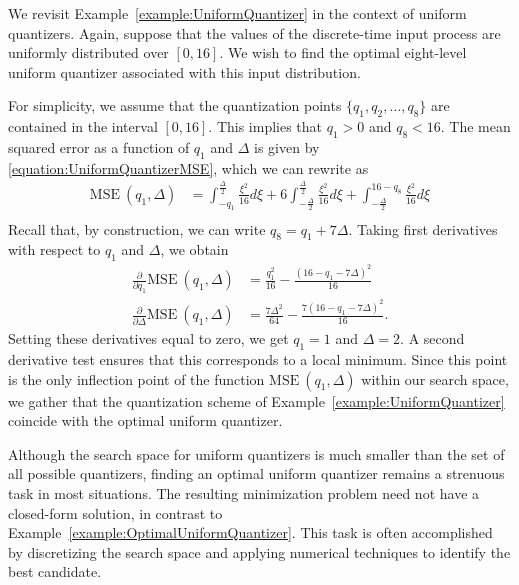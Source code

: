 \begin{example} \label{example:OptimalUniformQuantizer}
We revisit Example~\ref{example:UniformQuantizer} in the context of uniform quantizers.
Again, suppose that the values of the discrete-time input process are uniformly distributed over $[0, 16]$.
We wish to find the optimal eight-level uniform quantizer associated with this input distribution.

For simplicity, we assume that the quantization points $\{ q_1, q_2, \ldots, q_8 \}$ are contained in the interval $[0, 16]$.
This implies that $q_1 > 0$ and $q_8 < 16$.
The mean squared error as a function of $q_1$ and $\Delta$ is given by \eqref{equation:UniformQuantizerMSE}, which we can rewrite as
\begin{equation*}
\begin{split}
\text{MSE}~(q_1, \Delta)
&= \int_{-q_1}^{\frac{\Delta}{2}} \frac{\xi^2}{16} d\xi
+ 6 \int_{- \frac{\Delta}{2}}^{\frac{\Delta}{2}} \frac{\xi^2}{16} d\xi
+ \int_{- \frac{\Delta}{2}}^{16 - q_8} \frac{\xi^2}{16} d\xi \\
\end{split}
\end{equation*}
Recall that, by construction, we can write $q_8 = q_1 + 7 \Delta$.
Taking first derivatives with respect to $q_1$ and $\Delta$, we obtain
\begin{align*}
\frac{\partial}{\partial q_1} \text{MSE}~(q_1, \Delta)
&= \frac{q_1^2}{16} - \frac{(16 - q_1 - 7 \Delta)^2}{16} \\
\frac{\partial}{\partial \Delta} \text{MSE}~(q_1, \Delta)
&= \frac{7 \Delta^2}{64} - \frac{7 (16 - q_1 - 7\Delta)^2}{16} .
\end{align*}
Setting these derivatives equal to zero, we get $q_1 = 1$ and $\Delta = 2$.
A second derivative test ensures that this corresponds to a local minimum.
Since this point is the only inflection point of the function $\text{MSE}~(q_1, \Delta)$ within our search space, we gather that the quantization scheme of Example~\ref{example:UniformQuantizer} coincide with the optimal uniform quantizer.
\end{example}

Although the search space for uniform quantizers is much smaller than the set of all possible quantizers, finding an optimal uniform quantizer remains a strenuous task in most situations.
The resulting minimization problem need not have a closed-form solution, in contrast to Example~\ref{example:OptimalUniformQuantizer}.
This task is often accomplished by discretizing the search space and applying numerical techniques to identify the best candidate.



